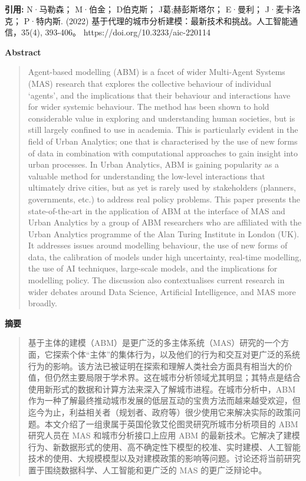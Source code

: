 \vspace{0.5em}
\noindent\textbf{引用:} N·马勒森； M·伯金； D伯克斯； J葛;赫彭斯塔尔； E·曼利； J·麦卡洛克； P·特内斯. (2022) 基于代理的城市分析建模：最新技术和挑战。人工智能通信，35(4), 393-406。 https://doi.org/10.3233/aic-220114

\vspace{1.5em}
\noindent\textbf{Abstract}\par
\begin{quote}\small
Agent-based modelling (ABM) is a facet of wider Multi-Agent Systems (MAS) research that explores the collective behaviour of individual ‘agents’, and the implications that their behaviour and interactions have for wider systemic behaviour. The method has been shown to hold considerable value in exploring and understanding human societies, but is still largely confined to use in academia. This is particularly evident in the field of Urban Analytics; one that is characterised by the use of new forms of data in combination with computational approaches to gain insight into urban processes. In Urban Analytics, ABM is gaining popularity as a valuable method for understanding the low-level interactions that ultimately drive cities, but as yet is rarely used by stakeholders (planners, governments, etc.) to address real policy problems. This paper presents the state-of-the-art in the application of ABM at the interface of MAS and Urban Analytics by a group of ABM researchers who are affiliated with the Urban Analytics programme of the Alan Turing Institute in London (UK). It addresses issues around modelling behaviour, the use of new forms of data, the calibration of models under high uncertainty, real-time modelling, the use of AI techniques, large-scale models, and the implications for modelling policy. The discussion also contextualises current research in wider debates around Data Science, Artificial Intelligence, and MAS more broadly.
\end{quote}

\noindent\textbf{摘要}\par
\begin{quote}\small
基于主体的建模（ABM）是更广泛的多主体系统（MAS）研究的一个方面，它探索个体“主体”的集体行为，以及他们的行为和交互对更广泛的系统行为的影响。该方法已被证明在探索和理解人类社会方面具有相当大的价值，但仍然主要局限于学术界。这在城市分析领域尤其明显；其特点是结合使用新形式的数据和计算方法来深入了解城市进程。在城市分析中，ABM 作为一种了解最终推动城市发展的低层互动的宝贵方法而越来越受欢迎，但迄今为止，利益相关者（规划者、政府等）很少使用它来解决实际的政策问题。本文介绍了一组隶属于英国伦敦艾伦图灵研究所城市分析项目的 ABM 研究人员在 MAS 和城市分析接口上应用 ABM 的最新技术。它解决了建模行为、新数据形式的使用、高不确定性下模型的校准、实时建模、人工智能技术的使用、大规模模型以及对建模政策的影响等问题。讨论还将当前研究置于围绕数据科学、人工智能和更广泛的 MAS 的更广泛辩论中。
\end{quote}

